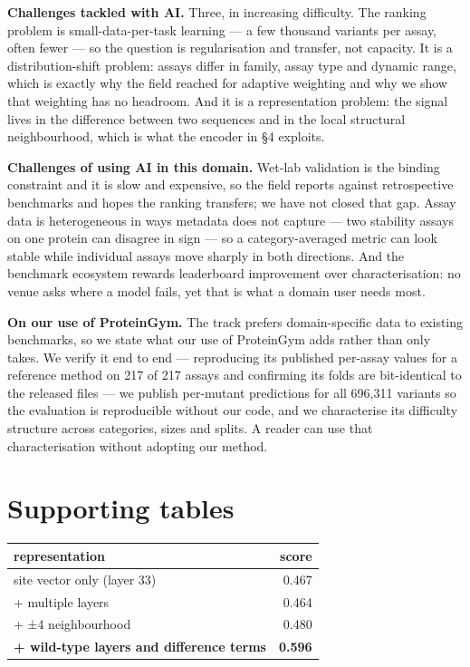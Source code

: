 \documentclass{article}
\begin{document}
\textbf{Challenges tackled with AI.} Three, in increasing difficulty. The ranking problem is small-data-per-task
learning --- a few thousand variants per assay, often fewer --- so the question is regularisation and
transfer, not capacity. It is a distribution-shift problem: assays differ in family, assay type and
dynamic range, which is exactly why the field reached for adaptive weighting and why we show that
weighting has no headroom. And it is a representation problem: the signal lives in the difference between
two sequences and in the local structural neighbourhood, which is what the encoder in §4 exploits.

\textbf{Challenges of using AI in this domain.} Wet-lab validation is the binding constraint and it is slow
and expensive, so the field reports against retrospective benchmarks and hopes the ranking transfers; we
have not closed that gap. Assay data is heterogeneous in ways metadata does not capture --- two stability
assays on one protein can disagree in sign --- so a category-averaged metric can look stable while
individual assays move sharply in both directions. And the benchmark ecosystem rewards leaderboard
improvement over characterisation: no venue asks where a model fails, yet that is what a domain user
needs most.

\textbf{On our use of ProteinGym.} The track prefers domain-specific data to existing benchmarks, so we state
what our use of ProteinGym adds rather than only takes. We verify it end to end --- reproducing its
published per-assay values for a reference method on 217 of 217 assays and confirming its folds are
bit-identical to the released files --- we publish per-mutant predictions for all 696,311 variants so the
evaluation is reproducible without our code, and we characterise its difficulty structure across
categories, sizes and splits. A reader can use that characterisation without adopting our method.
\section{Supporting tables}
\begin{table}[t]
\centering
\small
\begin{tabular}{lr}
\hline
representation & score \\
\hline
site vector only (layer 33) & 0.467 \\
+ multiple layers & 0.464 \\
+ ±4 neighbourhood & 0.480 \\
\textbf{+ wild-type layers and difference terms} & \textbf{0.596} \\
\hline
\end{tabular}
\end{table}
\end{document}
